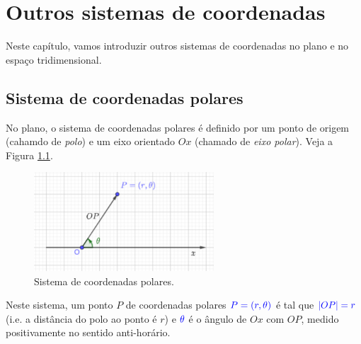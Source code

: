 
\chapter{Outros sistemas de coordenadas}\label{cap_osc}
\thispagestyle{fancy}

Neste capítulo, vamos introduzir outros sistemas de coordenadas no plano e no espaço tridimensional.

\section{Sistema de coordenadas polares}\label{cap_osc_scp}

No plano, o sistema de coordenadas polares é definido por um ponto de origem (cahamdo de \emph{polo}) e um eixo orientado $Ox$ (chamado de \emph{eixo polar}). Veja a Figura \ref{fig:osc_scp}.

\begin{figure}[H]
  \centering
  \includegraphics[width=0.6\textwidth]{cap_osc/dados/fig_osc_scp/fig}
  \caption{Sistema de coordenadas polares.}
  \label{fig:osc_scp}
\end{figure}

Neste sistema, um ponto $P$ de coordenadas polares ${\color{blue}P=(r, \theta)}$ é tal que ${\color{blue}|OP| = r}$ (i.e. a distância do polo ao ponto é $r$) e ${\color{blue}\theta}$ é o ângulo de $Ox$ com $OP$, medido positivamente no sentido anti-horário.

